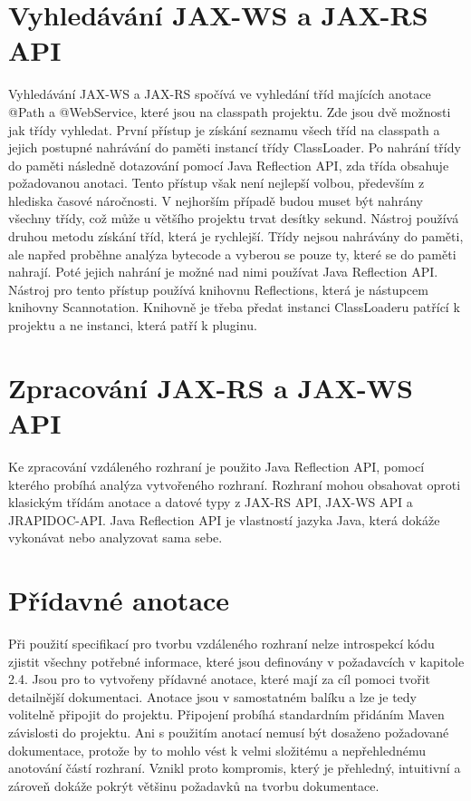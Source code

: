 \documentclass[11pt,twoside,a4paper]{book}
\begin{document}
\section{Vyhledávání JAX-WS a JAX-RS API}

Vyhledávání JAX-WS a JAX-RS spočívá ve vyhledání tříd majících anotace @Path a
@WebService, které jsou na classpath projektu. Zde jsou dvě možnosti jak třídy vyhledat.
První přístup je získání seznamu všech tříd na classpath a jejich postupné nahrávání do paměti
instancí třídy ClassLoader. Po nahrání třídy do paměti následně dotazování pomocí Java
Reflection API, zda třída obsahuje požadovanou anotaci. Tento přístup však není nejlepší
volbou, především z hlediska časové náročnosti. V nejhorším případě budou muset
být nahrány všechny třídy, což může u většího projektu trvat desítky sekund. Nástroj používá
druhou metodu získání tříd, která je rychlejší. Třídy nejsou nahrávány do paměti, ale napřed
proběhne analýza bytecode a vyberou se pouze ty, které se do paměti nahrají. Poté jejich
nahrání je možné nad nimi používat Java Reflection API. Nástroj pro tento přístup používá
knihovnu Reflections, která je nástupcem knihovny Scannotation. Knihovně je třeba předat
instanci ClassLoaderu patřící k projektu a ne instanci, která patří k pluginu.

\section{Zpracování JAX-RS a JAX-WS API}

Ke zpracování vzdáleného rozhraní je použito Java Reflection API, pomocí kterého probíhá
analýza vytvořeného rozhraní. Rozhraní mohou obsahovat oproti klasickým třídám anotace a
datové typy z JAX-RS API, JAX-WS API a JRAPIDOC-API. Java Reflection API je
vlastností jazyka Java, která dokáže vykonávat nebo analyzovat sama sebe.

\section{Přídavné anotace}

Při použití specifikací pro tvorbu vzdáleného rozhraní nelze introspekcí kódu zjistit všechny
potřebné informace, které jsou definovány v požadavcích v kapitole 2.4. Jsou pro to
vytvořeny přídavné anotace, které mají za cíl pomoci tvořit detailnější dokumentaci. Anotace
jsou v samostatném balíku a lze je tedy volitelně připojit do projektu. Připojení probíhá
standardním přidáním Maven závislosti do projektu. Ani s použitím anotací nemusí být
dosaženo požadované dokumentace, protože by to mohlo vést k velmi složitému a
nepřehlednému anotování částí rozhraní. Vznikl proto kompromis, který je přehledný,
intuitivní a zároveň dokáže pokrýt většinu požadavků na tvorbu dokumentace.
\end{document}
